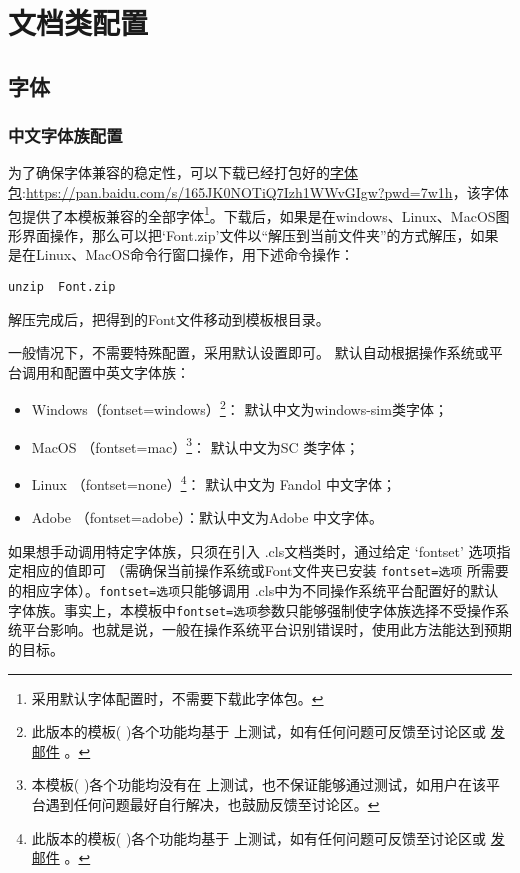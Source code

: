 \chapter{\projectname 文档类配置}\label{cha:clscfg}




\section{字体}\label{sec:fontset}
\subsection{中文字体族配置}
为了确保字体兼容的稳定性，可以下载已经打包好的\href{https://pan.baidu.com/s/165JK0NOTiQ7Izh1WWvGIgw?pwd=7w1h}{字体包}:\url{https://pan.baidu.com/s/165JK0NOTiQ7Izh1WWvGIgw?pwd=7w1h}，该字体包提供了本模板兼容的全部字体\footnote{采用默认字体配置时，不需要下载此字体包。}。下载后，如果是在windows、Linux、MacOS图形界面操作，那么可以把‘Font.zip’文件以“解压到当前文件夹”的方式解压，如果是在Linux、MacOS命令行窗口操作，用下述命令操作：
\begin{lstlisting}
unzip  Font.zip
\end{lstlisting}
解压完成后，把得到的Font文件移动到模板根目录。


 一般情况下，不需要特殊配置，采用默认设置即可。
\projectname 默认自动根据操作系统或平台调用和配置中英文字体族：
\begin{itemize}
    \item Windows（fontset=windows）\footnote{此版本的模板( \project )各个功能均基于 \projectwindows 上测试，如有任何问题可反馈至讨论区或 \href{mailto:\projectemail }{发邮件} 。}： 默认中文为windows-sim类字体；
    \item MacOS （fontset=mac）\footnote{本模板( \project )各个功能均没有在 \projectmacos 上测试，也不保证能够通过测试，如用户在该平台遇到任何问题最好自行解决，也鼓励反馈至讨论区。}： 默认中文为SC 类字体；
    \item Linux （fontset=none）\footnote{此版本的模板( \project )各个功能均基于 \projectlinux 上测试，如有任何问题可反馈至讨论区或 \href{mailto:\projectemail }{发邮件} 。}： 默认中文为 Fandol 中文字体；
    \item Adobe （fontset=adobe）：默认中文为Adobe 中文字体。
\end{itemize}
如果想手动调用特定字体族，只须在引入 \projectname.cls文档类时，通过给定 ‘fontset’ 选项指定相应的值即可 （需确保当前操作系统或Font文件夹已安装 \texttt{fontset=选项} 所需要的相应字体）。\texttt{fontset=选项}只能够调用 \projectname.cls中为不同操作系统平台配置好的默认字体族。事实上，本模板中\texttt{fontset=选项}参数只能够强制使字体族选择不受操作系统平台影响。也就是说，一般在操作系统平台识别错误时，使用此方法能达到预期的目标。

